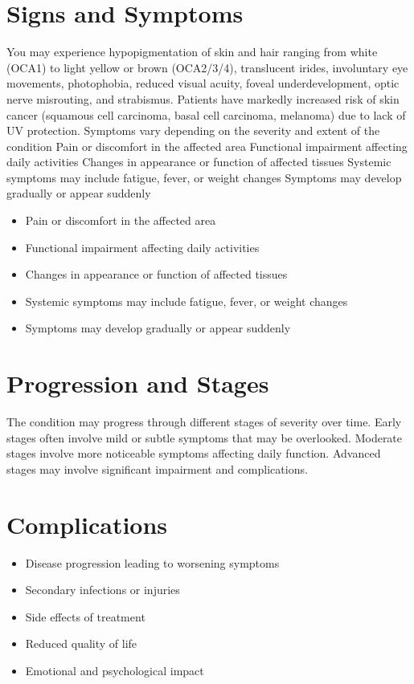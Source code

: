 \section{Signs and Symptoms}
You may experience hypopigmentation of skin and hair ranging from white (OCA1) to light yellow or brown (OCA2/3/4), translucent irides, involuntary eye movements, photophobia, reduced visual acuity, foveal underdevelopment, optic nerve misrouting, and strabismus. Patients have markedly increased risk of skin cancer (squamous cell carcinoma, basal cell carcinoma, melanoma) due to lack of UV protection. Symptoms vary depending on the severity and extent of the condition Pain or discomfort in the affected area Functional impairment affecting daily activities Changes in appearance or function of affected tissues Systemic symptoms may include fatigue, fever, or weight changes Symptoms may develop gradually or appear suddenly

\begin{itemize}[noitemsep]
  \item Pain or discomfort in the affected area
  \item Functional impairment affecting daily activities
  \item Changes in appearance or function of affected tissues
  \item Systemic symptoms may include fatigue, fever, or weight changes
  \item Symptoms may develop gradually or appear suddenly
\end{itemize}
\section{Progression and Stages}
The condition may progress through different stages of severity over time. Early stages often involve mild or subtle symptoms that may be overlooked. Moderate stages involve more noticeable symptoms affecting daily function. Advanced stages may involve significant impairment and complications.
\section{Complications}
\begin{itemize}[noitemsep]
  \item Disease progression leading to worsening symptoms
  \item Secondary infections or injuries
  \item Side effects of treatment
  \item Reduced quality of life
  \item Emotional and psychological impact
\end{itemize}
